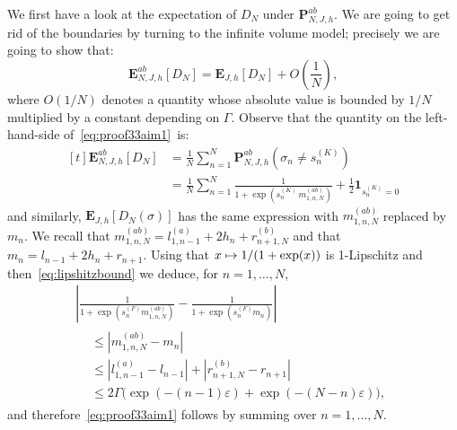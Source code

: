 \documentclass[10pt]{amsart}
\theoremstyle{definition}\newtheorem{defi}[theo]{Definition}\newtheorem{rema}[theo]{Remark}\newtheorem{exam}[theo]{Example}\newtheorem{exem}[theo]{Example}\newtheorem{nota}[theo]{Notation}
\newcommand{\ind}{\mathbf{1}}
\newcommand{\bP}{\mathbf{P}}
\newcommand{\bE}{\mathbf{E}}
\newcommand{\gep}{\varepsilon}
\newcommand{\gG}{\Gamma}
\newcommand{\gs}{\sigma}
\let\oldmapsto\mapsto
\renewcommand*{\mapsto}{\mathchoice{\longmapsto}{\oldmapsto}{\oldmapsto}{\oldmapsto}}
\begin{document}
We first have a look at the expectation of $D_N$ under $\bP_{N, J, h}^{ab}$. We are going to get rid of the boundaries by turning to the infinite volume model; precisely we are going to show that:
\begin{equation}\label{eq:proof33aim1}
\bE^{ab}_{N, J, h}\left[D_N\right]
= \bE_{J, h}\left[D_N\right]+O\left(\frac1N\right),
\end{equation}
where $O\left(1/N\right)$ denotes a quantity whose absolute value is bounded by $1/N$ multiplied by a constant depending on $\gG$. Observe that the quantity on the left-hand-side of~\eqref{eq:proof33aim1}~is:
\begin{equation}\label{eq:proof33linearity}
\begin{aligned}[t]
\bE^{ab}_{N, J, h}\left[D_N\right] &= \frac 1N \sum_{n=1}^N \bP^{ab}_{N, J, h}\left(\gs_n \neq s^{(K)}_n\right) \\
& = \frac 1N \sum_{n=1}^N \frac {1}{1+ \exp\left(s^{(K)}_n\, m^{(ab)}_{1, n, N}\right)}+\frac12 \ind_{s_n^{(K)}=0}
\end{aligned}
\end{equation}
and similarly, $\bE_{J, h}\left[D_N(\sigma)\right]$ has the same expression with $m^{(ab)}_{1, n, N}$ replaced by $m_n$. We recall that $m^{(ab)}_{1, n, N}=l^{(a)}_{1, n-1} +2h_n+ r^{(b)}_{n+1, N}$ and that $m_n=l_{n-1} +2h_n+ r_{n+1}$. Using that $x\mapsto 1/{(1+\exp(x))}$ is 1-Lipschitz and then~\eqref{eq:lipshitzbound} we deduce, for $n=1, \dots, N$,
\begin{multline}\label{eq:contrlboundeffect}
\left|
\frac 1 {1+ \exp\left(s^{(F)}_n m^{(ab)}_{1, n, N}\right)} - \frac 1 {1+ \exp\left(s^{(F)}_n m_n\right)}
\right|\\
\begin{aligned}
&\le \left|m^{(ab)}_{1, n, N}-m_n\right|\\
&\le \left|l^{(a)}_{1, n-1}-l_{n-1}\right| + \left|r^{(b)}_{n+1, N}-r_{n+1}\right| \\
&\le 2\gG \bigl(\exp(-(n-1)\gep)+ \exp(-(N-n)\gep)\bigr),
\end{aligned}
\end{multline}
and therefore~\eqref{eq:proof33aim1} follows by summing over $n=1, \dots, N$.
\end{document}
